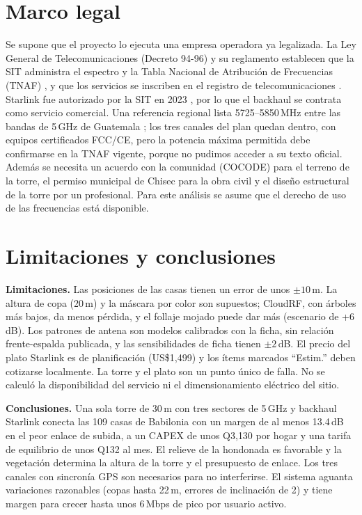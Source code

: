 \documentclass[11pt,a4paper]{article}
\begin{document}
\section{Marco legal}\label{sec:legal}
Se supone que el proyecto lo ejecuta una empresa operadora ya legalizada. La Ley General de Telecomunicaciones (Decreto 94-96) y su reglamento establecen que la SIT administra el espectro y la Tabla Nacional de Atribución de Frecuencias (TNAF) \cite{F05,F06}, y que los servicios se inscriben en el registro de telecomunicaciones \cite{F04}. Starlink fue autorizado por la SIT en 2023 \cite{F02}, por lo que el backhaul se contrata como servicio comercial. Una referencia regional lista 5725--5850\,MHz entre las bandas de 5\,GHz de Guatemala \cite{F28}; los tres canales del plan quedan dentro, con equipos certificados FCC/CE, pero la potencia máxima permitida debe confirmarse en la TNAF vigente, porque no pudimos acceder a su texto oficial. Además se necesita un acuerdo con la comunidad (COCODE) para el terreno de la torre, el permiso municipal de Chisec para la obra civil y el diseño estructural de la torre por un profesional. Para este análisis se asume que el derecho de uso de las frecuencias está disponible.

\section{Limitaciones y conclusiones}
\textbf{Limitaciones.} Las posiciones de las casas tienen un error de unos $\pm10$\,m. La altura de copa (20\,m) y la máscara por color son supuestos; CloudRF, con árboles más bajos, da menos pérdida, y el follaje mojado puede dar más (escenario de +6\,dB). Los patrones de antena son modelos calibrados con la ficha, sin relación frente-espalda publicada, y las sensibilidades de ficha tienen $\pm2$\,dB. El precio del plato Starlink es de planificación (US\$1{,}499) y los ítems marcados ``Estim.'' deben cotizarse localmente. La torre y el plato son un punto único de falla. No se calculó la disponibilidad del servicio ni el dimensionamiento eléctrico del sitio.

\textbf{Conclusiones.} Una sola torre de 30\,m con tres sectores de 5\,GHz y backhaul Starlink conecta las 109 casas de Babilonia con un margen de al menos 13.4\,dB en el peor enlace de subida, a un CAPEX de unos Q3{,}130 por hogar y una tarifa de equilibrio de unos Q132 al mes. El relieve de la hondonada es favorable y la vegetación determina la altura de la torre y el presupuesto de enlace. Los tres canales con sincronía GPS son necesarios para no interferirse. El sistema aguanta variaciones razonables (copas hasta 22\,m, errores de inclinación de 2\textdegree) y tiene margen para crecer hasta unos 6\,Mbps de pico por usuario activo.
\end{document}
